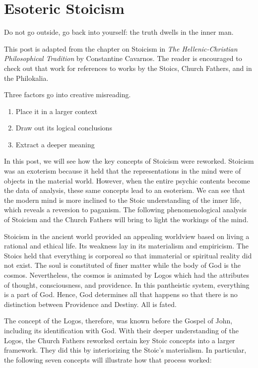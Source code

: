 \section{Esoteric Stoicism}

\begin{quotex}
Do not go outside, go back into yourself: the truth dwells in the inner man. 

This post is adapted from the chapter on Stoicism in \textit{The Hellenic-Christian Philosophical Tradition} by Constantine Cavarnos. The reader is encouraged to check out that work for references to works by the Stoics, Church Fathers, and in the Philokalia.
\end{quotex}
Three factors go into creative misreading.

\begin{enumerate}
\item Place it in a larger context 
\item Draw out its logical conclusions 
\item Extract a deeper meaning 
\end{enumerate}
In this post, we will see how the key concepts of Stoicism were reworked. Stoicism was an exoterism because it held that the representations in the mind were of objects in the material world. However, when the entire psychic contents become the data of analysis, these same concepts lead to an esoterism. We can see that the modern mind is more inclined to the Stoic understanding of the inner life, which reveals a reversion to paganism. The following phenomenological analysis of Stoicism and the Church Fathers will bring to light the workings of the mind.

Stoicism in the ancient world provided an appealing worldview based on living a rational and ethical life. Its weakness lay in its materialism and empiricism. The Stoics held that everything is corporeal so that immaterial or spiritual reality did not exist. The soul is constituted of finer matter while the body of God is the cosmos. Nevertheless, the cosmos is animated by Logos which had the attributes of thought, consciousness, and providence. In this pantheistic system, everything is a part of God. Hence, God determines all that happens so that there is no distinction between Providence and Destiny. All is fated.

The concept of the Logos, therefore, was known before the Gospel of John, including its identification with God. With their deeper understanding of the Logos, the Church Fathers reworked certain key Stoic concepts into a larger framework. They did this by interiorizing the Stoic's materialism. In particular, the following seven concepts will illustrate how that process worked:

